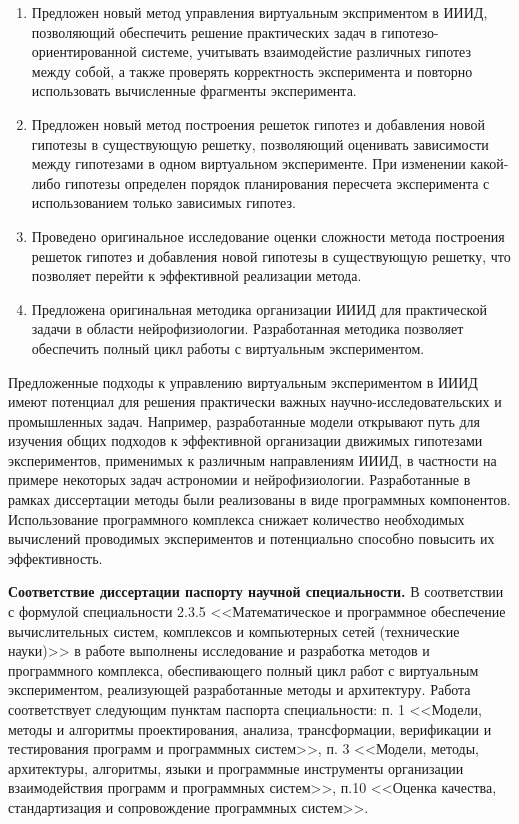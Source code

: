 {\novelty}
\begin{enumerate}[beginpenalty=10000] %
  \item Предложен новый метод управления виртуальным эксприментом в ИИИД, позволяющий 
        обеспечить решение практических задач в гипотезо-ориентированной системе, учитывать взаимодейстие различных 
        гипотез между собой, а также проверять корректность эксперимента и повторно использовать вычисленные фрагменты
        эксперимента. 
  \item Предложен новый метод построения решеток гипотез и добавления новой гипотезы в существующую решетку, 
        позволяющий оценивать зависимости между гипотезами в одном виртуальном эксперименте.	
        При изменении какой-либо гипотезы определен порядок планирования пересчета эксперимента с использованием 
        только зависимых гипотез. 
  \item Проведено оригинальное исследование оценки сложности метода построения решеток гипотез и 
        добавления новой гипотезы в существующую решетку, что позволяет перейти к эффективной реализации метода.
  \item Предложена оригинальная методика организации ИИИД для практической задачи в области нейрофизиологии. 
        Разработанная методика позволяет обеспечить полный цикл работы с виртуальным экспериментом.
\end{enumerate}

{\influence} Предложенные подходы к управлению виртуальным экспериментом в ИИИД имеют потенциал для решения практически 
важных научно-исследовательских и промышленных задач. Например, разработанные модели открывают путь для изучения общих 
подходов к эффективной организации движимых гипотезами экспериментов, применимых 
к различным направлениям ИИИД, в частности на примере некоторых задач астрономии и нейрофизиологии.
Разработанные в рамках диссертации методы были реализованы в виде программных компонентов. Использование программного 
комплекса снижает количество необходимых вычислений проводимых экспериментов и потенциально способно 
повысить их эффективность.

\textbf{Соответствие диссертации паспорту научной специальности.}
В соответствии с формулой специальности 2.3.5 <<Математическое и программное обеспечение вычислительных систем, 
комплексов и компьютерных сетей (технические науки)>> в работе выполнены исследование и разработка методов и 
программного комплекса, обеспивающего полный цикл работ с виртуальным экспериментом, 
реализующей разработанные методы и архитектуру. Работа соответствует следующим пунктам паспорта специальности: 
п. 1 <<Модели, методы и алгоритмы проектирования, анализа, трансформации,
верификации и тестирования программ и программных систем>>, п. 3 <<Модели, методы, архитектуры, алгоритмы, 
языки и программные инструменты организации взаимодействия программ и программных систем>>, п.10 <<Оценка качества, 
стандартизация и сопровождение программных систем>>.


